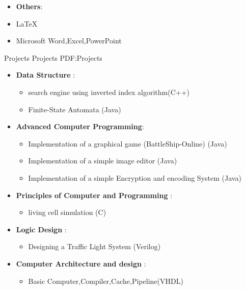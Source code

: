 \documentclass[letterpaper,MMMyyyy,nonstopmode]{simpleresumecv}
\begin{document}
\begin{Body}
\begin{itemize}
\begin{itemize}
\end{itemize}


 \item \textbf{Others}: 
\item{\LaTeX}
\item Microsoft Word,Excel,PowerPoint

\end{itemize}







\Section
{Projects}
{Projects}
{PDF:Projects}

\Entry
\begin{itemize}
	\item \textbf{Data Structure} :
		\begin{itemize}
		\item	search engine using inverted index algorithm(C++)
	     \item   Finite-State Automata (Java)
		\end{itemize}
		
	\item \textbf{Advanced Computer Programming}:
		\begin{itemize}
		\item  Implementation of a graphical game (BattleShip-Online) (Java)
     	\item Implementation of a simple image editor (Java)
	    \item Implementation of a simple Encryption and encoding System  (Java)
		\end{itemize}
		
	\item \textbf{Principles of Computer and Programming }: 
		\begin{itemize}
	    \item  living cell simulation (C)
	      	\end{itemize}
   	\item \textbf{Logic Design} : 
   		\begin{itemize}
     \item	Designing a Traffic Light System (Verilog)
     		\end{itemize}
   	\item \textbf{Computer Architecture and design} :
   		\begin{itemize}
		\item Basic Computer,Compiler,Cache,Pipeline(VHDL)
		\end{itemize}
		

\end{itemize}
\end{Body}
\end{document}
